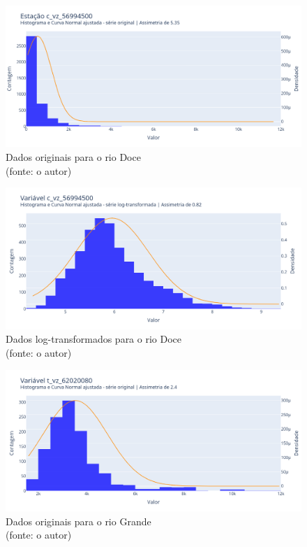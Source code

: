 \begin{figure}[!h]
	\centering
	\includegraphics[scale=0.33]{Figuras/rio_doce/rio_doce_antes_log.png}
	\caption{Dados originais para o rio Doce\\(fonte: o autor)}
	\label{fig:rio_doce_antes_log}
\end{figure}

\begin{figure}[!h]
	\centering
	\includegraphics[scale=0.33]{Figuras/rio_doce/rio_doce_depois_log.png}
	\caption{Dados log-transformados para o rio Doce\\(fonte: o autor)}
	\label{fig:rio_doce_depois_log}
\end{figure}

\begin{figure}[!h]
	\centering
	\includegraphics[scale=0.33]{Figuras/rio_grande/grande_estacao_t_vz_62020080_original.png}
	\caption{Dados originais para o rio Grande\\(fonte: o autor)}
	\label{fig:rio_grande_antes_log}
\end{figure}

